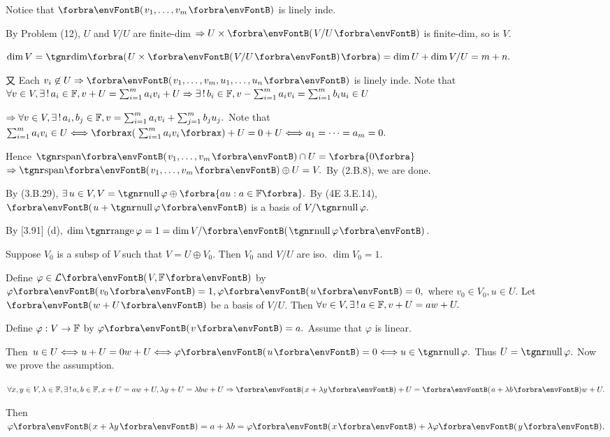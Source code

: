 \documentclass[a4paper, 11pt, UTF8]{article}
\begin{document}
\begin{large}
Notice that $\Par{v_1,\dots,v_m}$ is linely inde.\par\quad
By Problem (12), $U$ and $V/U$ are finite-dim $\Rightarrow U\times\Par{V/U}$ is finite-dim, so is $V$.\par\quad
$\dim V=\Dim\BigPar{U\times\Par{V/U}}=\dim U+\dim V/U=m+n.$\par\quad
又 Each $v_i\not\in U\Rightarrow\Par{v_1,\dots,v_m,u_1,\dots,u_n}$ is linely inde.\PfEnd\vspace{8pt}\quad
\Or Note that $\forall v\in V,\exists\,!\,a_i\in{\mathbb{F}},v+U=\sum_{i=1}^m a_i v_i+U\Rightarrow\exists\,!\,b_i\in{\mathbb{F}},v-\sum_{i=1}^m a_i v_i=\sum_{i=1}^m b_i u_i\in U$\par\quad
{} $\Rightarrow \forall v\in V,\exists\,!\,a_i,b_j\in{\mathbb{F}},v=\sum_{i=1}^m a_i v_i+\sum_{j=1}^m b_j u_j.$\PfEnd\vspace{8pt}\quad
\Or Note that $\sum_{i=1}^m a_i v_i\in U\Longleftrightarrow\XPar{\sum_{i=1}^m a_i v_i}+U=0+U\Longleftrightarrow a_1=\dots=a_m=0.$\vspace{4pt}\par\quad
Hence $\Span{v_1,\dots,v_m}\cap U=\zeroSubs$
$\Rightarrow\Span{v_1,\dots,v_m}\oplus U=V.$ By (2.B.8), we are done.\PfEnd
\SepLine\pagebreak

\par\quad
By (3.B.29), $\exists\,u\in V,V=\null\varphi\oplus\Bra{au:a\in\Fbb}.$ By (4E 3.E.14), $\Par{u+\null\varphi}$ is a basis of $V/\null\varphi.$\par\quad
\Or By [3.91] (d), $\dim\range\varphi=1=\dim V/\Par{\null \varphi}$.\PfEnd
\SepLine

\par\quad
Suppose $V_0$ is a subsp of $V$ such that $V=U\oplus V_0.$ Then $V_0$ and $V/U$ are iso. $\dim V_0=1.$\par\quad
Define $\varphi\in\Lm{V,\Fbb}$ by $\varphi\Par{v_0}=1,\varphi\Par{u}=0,$ where $v_0\in V_0,u\in U.$\PfEnd\vspace{6pt}\quad
\Or Let $\Par{w+U}$ be a basis of $V/U.$ Then $\forall v\in V,\exists\,!\,a\in{\mathbb{F}},v+U=aw+U.$\par\quad
Define $\varphi:{V\rightarrow{\mathbb{F}}}$ by $\varphi\Par{v}=a.$ Assume that $\varphi$ is linear.\par\quad
Then $u\in U\Longleftrightarrow u+U=0w+U\Longleftrightarrow\varphi\Par{u}=0\Longleftrightarrow u\in\null\varphi.$ Thus $U=\null\varphi.$\PfEnd\quad
Now we prove the assumption.\par\quad
$\forall x,y\in V,\lambda\in\Fbb,\exists\,!\,a,b\in\Fbb,x+U=a w+U,\lambda y+U=\lambda b w+U\Rightarrow \Par{x+\lambda y}+U=\Par{a+\lambda b}w+U.$\par\quad
Then $\varphi\Par{x+\lambda y}=a+\lambda b=\varphi\Par{x}+\lambda\varphi\Par{y}.$
\SepLine


\end{large}
\end{document}
